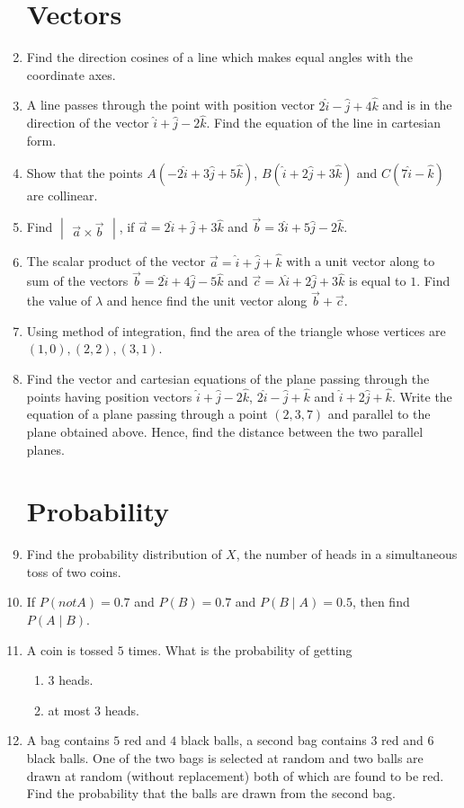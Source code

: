 \documentclass[2pt,-letter paper]{article}
\providecommand{\brak}[1]{\ensuremath{\left(#1\right)}}
\newcommand{\mydet}[1]{\ensuremath{\begin{vmatrix}#1\end{vmatrix}}}
\begin{document}
\begin{enumerate}
\section{Vectors}
\item Find the direction cosines of a line which makes equal angles with the coordinate axes.
\item A line passes through the point with position vector $2\hat{i}-\hat{j}+4\hat{k}$ and is in the direction of the vector $\hat{i}+\hat{j}-2\hat{k}$. Find the equation of the line in cartesian form.
\item Show that the points $A(-2\hat{i}+3\hat{j}+5\hat{k})$, $B(\hat{i}+2\hat{j}+3\hat{k})$ and $C(7\hat{i}-\hat{k})$ are collinear.
\item Find $\mydet{\overrightarrow{a}\times \overrightarrow{b}}$, if $\overrightarrow{a}=2\hat{i}+\hat{j}+3\hat{k}$ and $\overrightarrow{b}=3\hat{i}+5\hat{j}-2\hat{k}$.
\item The scalar product of the vector $\overrightarrow{a}=\hat{i}+\hat{j}+\hat{k}$ with a unit vector along to sum of the vectors $\overrightarrow{b}=2\hat{i}+4\hat{j}-5\hat{k}$ and $\overrightarrow{c}=\lambda\hat{i}+2\hat{j}+3\hat{k}$ is equal to $1$. Find the value of $\lambda$ and hence find the unit vector along $\overrightarrow{b} + \overrightarrow{c}$.
\item Using method of integration, find the area of the triangle whose vertices are $\brak{1,0}, \brak{2,2}, \brak{3,1}$.
	\item Find the vector and cartesian equations of the plane passing through the points having position vectors $\hat{i} + \hat{j} - 2\hat{k}$, $2\hat{i} - \hat{j} + \hat{k}$ and $\hat{i} + 2\hat{j} + \hat{k}$. Write the equation of a plane passing through a point $\brak{2,3,7}$ and parallel to the plane obtained above. Hence, find the distance between the two parallel planes.

\section{Probability}
\item Find the probability distribution of $X$, the number of  heads in a simultaneous toss of two coins.
\item If $P(not A)=0.7$ and $P(B) = 0.7$ and $P(B\mid A) = 0.5$, then find $P(A\mid B)$.
\item A coin is tossed $5$ times. What is the probability of getting
	\begin{enumerate}
	\item $3$ heads.
	\item at most $3$ heads.
        \end{enumerate}
\item A bag contains $5$ red and $4$ black balls, a second bag contains $3$ red and $6$ black balls. One of the two bags is selected at random and two balls are drawn at random (without replacement) both of which are found to be red. Find the probability that the balls are drawn from the second bag.

\end{enumerate}
\end{document}
